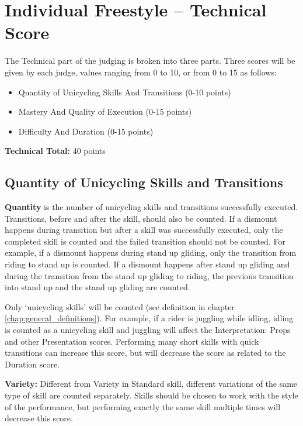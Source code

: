 \section{Individual Freestyle -- Technical Score \label{sec:freestyle_individual-technical-score}}
The Technical part of the judging is broken into three parts.
Three scores will be given by each judge, values ranging from 0 to 10, or from 0 to 15 as follows:
\begin{itemize}
\item Quantity of Unicycling Skills And Transitions (0-10 points)
\item Mastery And Quality of Execution (0-15 points)
\item Difficulty And Duration (0-15 points)
\end{itemize}
\textbf{Technical Total:} 40 points

\subsection{Quantity of Unicycling Skills and Transitions}
\textbf{Quantity} is the number of unicycling skills and transitions successfully executed.
Transitions, before and after the skill, should also be counted.
If a dismount happens during transition but after a skill was successfully executed, only the completed skill is counted and the failed transition should not be counted.
For example, if a dismount happens during stand up gliding, only the transition from riding to stand up is counted.
If a dismount happens after stand up gliding and during the transition from the stand up gliding to riding, the previous transition into stand up and the stand up gliding are counted.

Only `unicycling skills' will be counted (see definition in chapter \ref{chap:general_definitions}).
For example, if a rider is juggling while idling, idling is counted as a unicycling skill and juggling will affect the Interpretation: Props and other Presentation scores.
Performing many short skills with quick transitions can increase this score, but will decrease the score as related to the Duration score.

\textbf{Variety:} Different from Variety in Standard skill, different variations of the same type of skill are counted separately.
Skills should be chosen to work with the style of the performance, but performing exactly the same skill multiple times will decrease this score.


